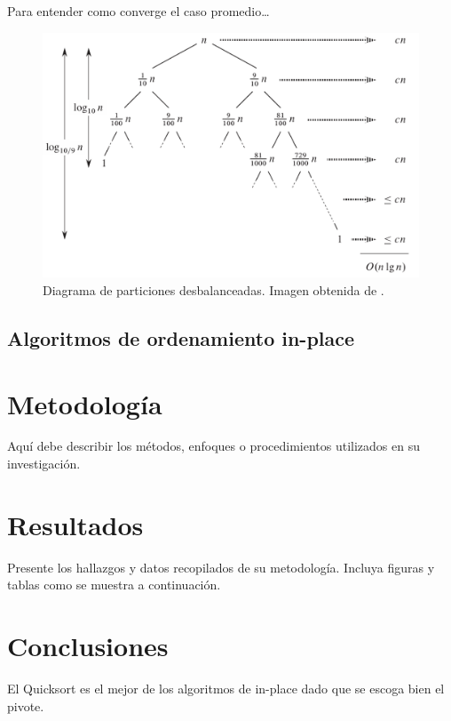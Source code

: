 \documentclass[conference]{IEEEtran}
\begin{document}
Para entender como converge el caso promedio\dots

\begin{figure}[h]
    \centering
    \includegraphics[scale=0.5]{convergence_avg_case.png}
    \caption{Diagrama de particiones desbalanceadas. Imagen obtenida de \cite{intro_algo}.}
    \label{fig:avg_case}

\end{figure}
\subsection{Algoritmos de ordenamiento in-place}
\cite{space_complexity}
\section{Metodología}
Aquí debe describir los métodos, enfoques o procedimientos utilizados en su investigación.

\section{Resultados}
Presente los hallazgos y datos recopilados de su metodología. Incluya figuras y tablas como se muestra a continuación.


\section{Conclusiones}
El Quicksort es el mejor de los algoritmos de in-place dado que se escoga bien el pivote.




\end{document}
